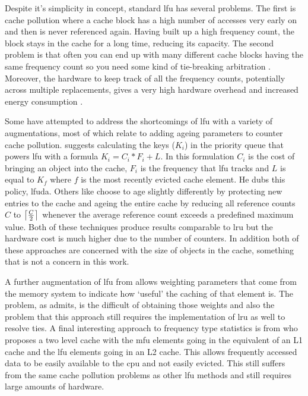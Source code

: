 Despite it's simplicity in concept, standard \gls{lfu} has several problems. The first is cache pollution \cite{karedlaCachingStrategiesImprove1994} where a cache block has a high number of accesses very early on and then is never referenced again. Having built up a high frequency count, the block stays in the cache for a long time, reducing its capacity. The second problem is that often you can end up with many different cache blocks having the same frequency count so you need some kind of tie-breaking arbitration \cite{podlipnigSurveyWebCache2003}.  Moreover, the hardware to keep track of all the frequency counts, potentially across multiple replacements, gives a very high hardware overhead and increased energy consumption \cite{pandaSurveyReplacementStrategies2016}. 

Some have attempted to address the shortcomings of \gls{lfu} with a variety of augmentations, most of which relate to adding ageing parameters to counter cache pollution. \citet{arlittEvaluatingContentManagement2000} suggests calculating the keys ($K_i$) in the priority queue that powers \gls{lfu} with a formula $K_i = C_i * F_i + L$. In this formulation $C_i$ is the cost of bringing an object into the cache, $F_i$ is the frequency that \gls{lfu} tracks and $L$ is equal to $K_f$ where $f$ is the most recently evicted cache element. He dubs this policy, \gls{lfuda}. Others like \citet{robinsonDataCacheManagement1990} choose to age slightly differently by protecting new entries to the cache and ageing the entire cache by reducing all reference counts $C$ to $\ceil[\big]{\frac{C}{2}}$ whenever the average reference count exceeds a predefined maximum value. Both of these techniques produce results comparable to \gls{lru} but the hardware cost is much higher due to the number of counters. In addition both of these approaches are concerned with the size of objects in the cache, something that is not a concern in this work.

A further augmentation of \gls{lfu} from \citet{kellyVariableQosShared1999} allows weighting parameters that come from the memory system to indicate how `useful' the caching of that element is. The problem, as \citeauthor{kellyVariableQosShared1999} admits, is the difficult of obtaining those weights and also the problem that this approach still requires the implementation of \gls{lru} as well to resolve ties. A final interesting approach to frequency type statistics is from \citet{mekhielMultiLevelCacheMost29} who proposes a two level cache with the \gls{mfu} elements going in the equivalent of an L1 cache and the \gls{lfu} elements going in an L2 cache. This allows frequently accessed data to be easily available to the \gls{cpu} and not easily evicted. This still suffers from the same cache pollution problems as other \gls{lfu} methods and still requires large amounts of hardware.

